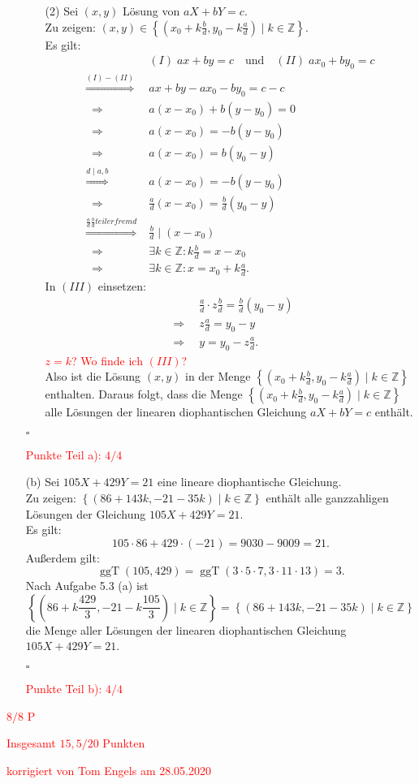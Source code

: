 \documentclass[12pt]{article}
\newcommand{\corr}[1]{\textcolor{red}{#1}}
\newcommand{\QED}{\begin{flushright} $\square$ \end{flushright}}
\newcommand{\df}{\enspace\Longrightarrow\enspace}
\newcommand{\ggT}{\operatorname{ggT}}
\begin{document}
\begin{enumerate}
\begin{enumerate}
		\item[(2)] Sei $(x,y)$ Lösung von $aX+bY=c$. \\
		Zu zeigen: $(x,y)\in\left\{(x_0+k\frac{b}{d},y_0-k\frac{a}{d})\mid k\in\mathbb{Z}\right\}$. \\
		Es gilt:
		\begin{align*}
			&(I)\; ax+by=c\quad\text{und}\quad (II)\; ax_0+by_0=c \\
			\overset{(I)-(II)}{\df} &ax+by-ax_0-by_0=c-c \\
			\df &a(x-x_0)+b(y-y_0)=0 \\
			\df &a(x-x_0)=-b(y-y_0) \\
			\df &a(x-x_0)=b(y_0-y) \\
			\overset{d\mid a,b}{\df} &a(x-x_0)=-b(y-y_0) \\
			\df &\frac{a}{d}(x-x_0)=\frac{b}{d}(y_0-y) \\
			\overset{\frac{a}{d}\frac{b}{d} teilerfremd}{\df} \;&\frac{b}{d}\mid(x-x_0) \\
			\df &\exists k\in\mathbb{Z}:k\frac{b}{d}=x-x_0 \\
			\df &\exists k\in\mathbb{Z}:x=x_0+k\frac{a}{d}.
		\end{align*}
		In $(III)$ einsetzen:
		\begin{align*}
			&\frac{a}{d}\cdot z\frac{b}{d}=\frac{b}{d}(y_0-y) \\
			\df &z\frac{a}{d}=y_0-y \\
			\df &y=y_0-z\frac{a}{d}.
		\end{align*}
\corr{$z=k$? Wo finde ich $(III)$?}\\
		Also ist die Lösung $(x,y)$ in der Menge $\left\{(x_0+k\frac{b}{d},y_0-k\frac{a}{d})\mid k\in\mathbb{Z}\right\}$ enthalten. Daraus folgt, dass die Menge $\left\{(x_0+k\frac{b}{d},y_0-k\frac{a}{d})\mid k\in\mathbb{Z}\right\}$ alle Lösungen der linearen diophantischen Gleichung $aX+bY=c$ enthält.
	\end{enumerate}
	\QED
\corr{Punkte Teil a): $4/4$}
	
	\item[(b)] Sei $105X+429Y=21$ eine lineare diophantische Gleichung. \\
	Zu zeigen: $\left\{(86+143k,-21-35k)\mid k\in\mathbb{Z}\right\}$ enthält alle ganzzahligen Lösungen der Gleichung $105X+429Y=21$. \\
	Es gilt:
	$$105\cdot 86+429\cdot (-21)=9030-9009=21.$$
	Außerdem gilt:
	$$\ggT(105,429)=\ggT(3\cdot 5\cdot 7,3\cdot 11\cdot 13)=3.$$
	Nach Aufgabe 5.3 (a) ist $$\left\{(86+k\frac{429}{3},-21-k\frac{105}{3})\mid k\in\mathbb{Z}\right\}=\left\{(86+143k,-21-35k)\mid k\in\mathbb{Z}\right\}$$ die Menge aller Lösungen der linearen diophantischen Gleichung $105X+429Y=21$.
	\QED
\corr{Punkte Teil b): $4/4$}
\end{enumerate}
\corr{$8/8$ P}

\bigskip

\corr{Insgesamt $15,5/20$ Punkten}

\bigskip

\corr{korrigiert von Tom Engels am 28.05.2020}
\end{document}
